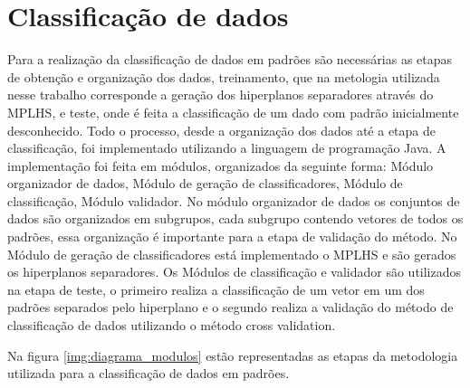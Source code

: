 \chapter{Classificação de dados}
Para a realização da classificação de dados em padrões são necessárias as etapas de obtenção e organização dos dados, treinamento, que na metologia utilizada nesse trabalho corresponde a geração dos hiperplanos separadores através do MPLHS, e teste, onde é feita a classificação de um dado com padrão inicialmente desconhecido.
Todo o processo, desde a organização dos dados até a etapa de classificação, foi implementado utilizando a linguagem de programação Java. A implementação foi feita em módulos, organizados da seguinte forma: Módulo organizador de dados, Módulo de geração de classificadores, Módulo de classificação, Módulo validador. No módulo organizador de dados os conjuntos de dados são organizados em subgrupos, cada subgrupo contendo vetores de todos os padrões, essa organização é importante para a etapa de validação do método. No Módulo de geração de classificadores está implementado o MPLHS e são gerados os hiperplanos separadores. Os Módulos de classificação e validador são utilizados na etapa de teste, o primeiro realiza a classificação de um vetor em um dos padrões separados pelo hiperplano e o segundo realiza a validação do método de classificação de dados utilizando o método cross validation.

Na figura \ref{img:diagrama_modulos} estão representadas as etapas da metodologia utilizada para a classificação de dados em padrões.

